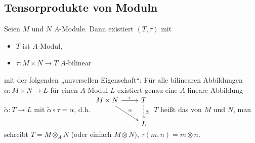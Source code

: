 \subsection{Tensorprodukte von Moduln}

\begin{st}
    Seien $M$ und $N$ $A$-Module.
    Dann existiert $(T, \tau)$ mit
    \begin{itemize}
        \item
            $T$ ist $A$-Modul,
        \item
            $\tau: M \times N \to T$ $A$-bilinear
    \end{itemize}
    mit der folgenden „unversellen Eigenschaft“:
    Für alle bilinearen Abbildungen $\alpha: M \times N \to L$ für einen $A$-Modul $L$ existiert genau eine $A$-lineare Abbildung $\tilde \alpha: T \to L$ mit $\tilde \alpha \circ \tau = \alpha$, d.h.
    \begin{math}
        \begin{tikzcd}
            M \times N \ar[r,"\tau"] \ar[dr,"\alpha"] & T \ar[d,dashed,"\tilde \alpha"] \\
            & L
        \end{tikzcd}
    \end{math}
    $T$ heißt das  von $M$ und $N$, man schreibt $T = M \otimes_A N$ (oder einfach $M \otimes N$), $\tau(m,n) = m \otimes n$.


\end{st}
